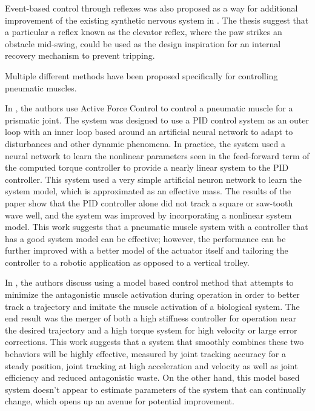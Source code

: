 Event-based control through reflexes was also proposed as a way for additional
improvement of the existing synthetic nervous system in \cite{HuntPhDThesis}.
The thesis suggest that a particular a reflex known as the elevator reflex,
where the paw strikes an
obstacle mid-swing, could be used as the design inspiration for an internal recovery
mechanism to prevent tripping.


Multiple different methods have been proposed specifically for controlling 
pneumatic muscles.

In \cite{Jahanabadi2009}, the authors use Active Force Control
to control a pneumatic muscle for a prismatic joint. The system was designed to
use a PID control system as an outer loop with an inner loop based around an
artificial neural network to adapt to disturbances and other dynamic phenomena.
In practice, the system used a neural network to learn the nonlinear parameters
seen in the feed-forward term of the computed torque controller to provide a
nearly linear system to the PID controller. This system used a very simple
artificial neuron network to learn the system model, which is approximated as an
effective mass. The results of the paper show that the PID controller alone did
not track a square or saw-tooth wave well, and the system was improved by
incorporating a nonlinear system model. This work suggests that a pneumatic 
muscle system with a controller that has a good system model can be effective; however, the performance can be further improved with a better model of the
actuator itself and tailoring the controller to a robotic application as opposed
to a vertical trolley.

In \cite{Wang2013}, the authors discuss using a model based control method that
attempts to minimize the antagonistic muscle activation during operation in
order to better track a trajectory and imitate the muscle activation of a
biological system. The end result was the merger of both a high stiffness 
controller for operation near the desired trajectory and a high torque system
for high velocity or large error corrections. This work suggests that a system 
that smoothly combines these two behaviors will be highly effective, measured by
joint tracking accuracy for a steady position, joint tracking at high 
acceleration and velocity as well as joint efficiency and reduced antagonistic
waste. On the other hand, this model based system doesn't appear to estimate
parameters of the system that can continually change, which opens up an avenue
for potential improvement.


